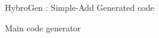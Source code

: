 \begin{Frame}{HybroGen : Simple-Add Generated code}
    \begin{block}{Main code generator}
      
    \end{block}

\end{Frame}
